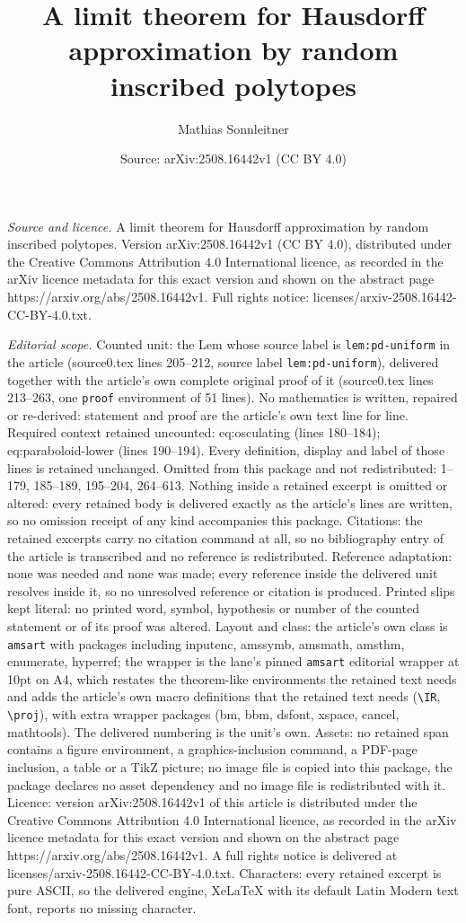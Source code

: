 \documentclass[10pt,a4paper]{amsart}
\title[A limit theorem for Hausdorff approximation by random inscri]{A limit theorem for Hausdorff approximation by random inscribed polytopes}
\author{Mathias Sonnleitner}
\date{Source: arXiv:2508.16442v1 (CC BY 4.0)}
\begin{document}
\maketitle

\noindent\emph{Source and licence.} A limit theorem for Hausdorff approximation by random inscribed polytopes. Version arXiv:2508.16442v1 (CC BY 4.0), distributed under the Creative Commons Attribution 4.0 International licence, as recorded in the arXiv licence metadata for this exact version and shown on the abstract page https://arxiv.org/abs/2508.16442v1. Full rights notice: licenses/arxiv-2508.16442-CC-BY-4.0.txt.\par\smallskip

\noindent\textit{Editorial scope.} Counted unit: the Lem whose source label is \texttt{lem:pd-uniform} in the article (source0.tex lines 205--212, source label \texttt{lem:pd-uniform}), delivered together with the article's own complete original proof of it (source0.tex lines 213--263, one \texttt{proof} environment of 51 lines). No mathematics is written, repaired or re-derived: statement and proof are the article's own text line for line. Required context retained uncounted: eq:osculating (lines 180--184); eq:paraboloid-lower (lines 190--194). Every definition, display and label of those lines is retained unchanged. Omitted from this package and not redistributed: 1--179, 185--189, 195--204, 264--613. Nothing inside a retained excerpt is omitted or altered: every retained body is delivered exactly as the article's lines are written, so no omission receipt of any kind accompanies this package. Citations: the retained excerpts carry no citation command at all, so no bibliography entry of the article is transcribed and no reference is redistributed. Reference adaptation: none was needed and none was made; every reference inside the delivered unit resolves inside it, so no unresolved reference or citation is produced. Printed slips kept literal: no printed word, symbol, hypothesis or number of the counted statement or of its proof was altered. Layout and class: the article's own class is \texttt{amsart} with packages including inputenc, amssymb, amsmath, amsthm, enumerate, hyperref; the wrapper is the lane's pinned \texttt{amsart} editorial wrapper at 10pt on A4, which restates the theorem-like environments the retained text needs and adds the article's own macro definitions that the retained text needs (\texttt{\textbackslash IR}, \texttt{\textbackslash proj}), with extra wrapper packages (bm, bbm, dsfont, xspace, cancel, mathtools). The delivered numbering is the unit's own. Assets: no retained span contains a figure environment, a graphics-inclusion command, a PDF-page inclusion, a table or a TikZ picture; no image file is copied into this package, the package declares no asset dependency and no image file is redistributed with it. Licence: version arXiv:2508.16442v1 of this article is distributed under the Creative Commons Attribution 4.0 International licence, as recorded in the arXiv licence metadata for this exact version and shown on the abstract page https://arxiv.org/abs/2508.16442v1. A full rights notice is delivered at licenses/arxiv-2508.16442-CC-BY-4.0.txt. Characters: every retained excerpt is pure ASCII, so the delivered engine, XeLaTeX with its default Latin Modern text font, reports no missing character.
\end{document}
